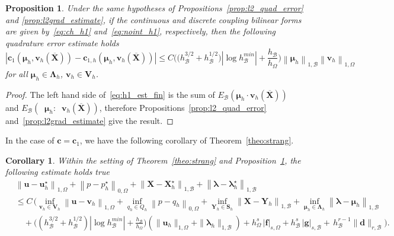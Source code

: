 \documentclass[oneside]{amsart} %
\newcommand{\norm}[1]{\left\lVert#1\right\rVert}
\newcommand{\abs}[1]{\left\lvert#1\right\rvert}
\newtheorem{prop}{Proposition}
\newtheorem{corollary}{Corollary}
\DeclareMathOperator{\grads}{\boldsymbol\nabla_s}
\newcommand\B{\mathcal B} %
\renewcommand\u{\mathbf{u}} %
\renewcommand\v{\mathbf{v}} %
\renewcommand\d{\mathbf{d}} %
\renewcommand\c{\mathbf{c}} %
\newcommand\f{\mathbf{f}} %
\newcommand\g{\mathbf{g}} %
\renewcommand\S{\mathbf{S}} %
\newcommand\X{\mathbf{X}} %
\newcommand\Xbar{\overline{\X}} %
\newcommand\Y{\mathbf{Y}} %
\newcommand\LL{{\boldsymbol{\Lambda}}} %
\newcommand\Vline{\mathbf{V}} %
\newcommand\Sline{\S} %
\newcommand\llambda{\boldsymbol\lambda} %
\newcommand\mmu{{\boldsymbol\mu}} %
\begin{document}
	\begin{prop}\label{prop:h1_final}
		Under the same hypotheses of Propositions~\ref{prop:l2_quad_error} and \ref{prop:l2grad_estimate}, if the continuous and discrete coupling bilinear forms are given by~\eqref{eq:ch_h1} and~\eqref{eq:noint_h1}, respectively, then the following quadrature error estimate holds
		\begin{equation}\label{eq:h1_est_fin}
			\abs{\c_1(\mmu_h,\v_h(\Xbar))-\c_{1,h}(\mmu_h,\v_h(\Xbar))}\le
			C \bigg( \big( h_\B^{3/2} + h_\B^{1/2}\big)|\log h_\B^{min}| + \frac{h_\B}{h_\Omega} \bigg) \norm{\mmu_h}_{1,\B}\norm{\v_h}_{1,\Omega}
		\end{equation}
		for all $\mmu_h\in\LL_h$, $\v_h\in\Vline_h$.
	\end{prop}
	
	\begin{proof}
		The left hand side of~\eqref{eq:h1_est_fin} is the sum of $E_\B(\mmu_h\cdot\v_h(\Xbar))$ and ${E_\B(\grads\mmu_h:\grads\v_h(\Xbar))}$, therefore Propositions~\ref{prop:l2_quad_error} and~\ref{prop:l2grad_estimate} give the result.
	\end{proof}
	In the case of $\c=\c_1$, we have the following corollary of Theorem~\ref{theo:strang}.
	\begin{corollary}
		Within the setting of Theorem~\ref{theo:strang} and Proposition~\ref{prop:h1_final}, the following estimate holds true
		\begin{equation*}
			\begin{aligned}
				&\norm{\u-\u_h^\star}_{1,\Omega} + \norm{p-p_h^\star}_{0,\Omega} + \norm{\X-\X_h^\star}_{1,\B} + \norm{\llambda-\llambda_h^\star}_{1,\B} \\
				&\le C\,\bigg(\inf_{\v_h\in\Vline_h}\norm{\u-\v_h}_{1,\Omega} + \inf_{q_h\in Q_h}\norm{p-q_h}_{0,\Omega} + \inf_{\Y_h\in\Sline_h}\norm{\X-\Y_h}_{1,\B} + \inf_{\mmu_h\in\LL_h}\norm{\llambda-\mmu_h}_{1,\B} \\
				&\quad+\big( ( h_\B^{3/2} + h_\B^{1/2})|\log h_\B^{min}| + \frac{h_\B}{h_\Omega} \big)(\|\u_h\|_{1,\Omega}+\|\llambda_h\|_{1,\B})
				+ h_\Omega^s\,|\f|_{s,\Omega} + h_\B^s\,|\g|_{s,\B} +\,  h_\B^{r-1}\|\d\|_{r,\B}\bigg).
			\end{aligned}
		\end{equation*}
	\end{corollary}
	
\end{document}
